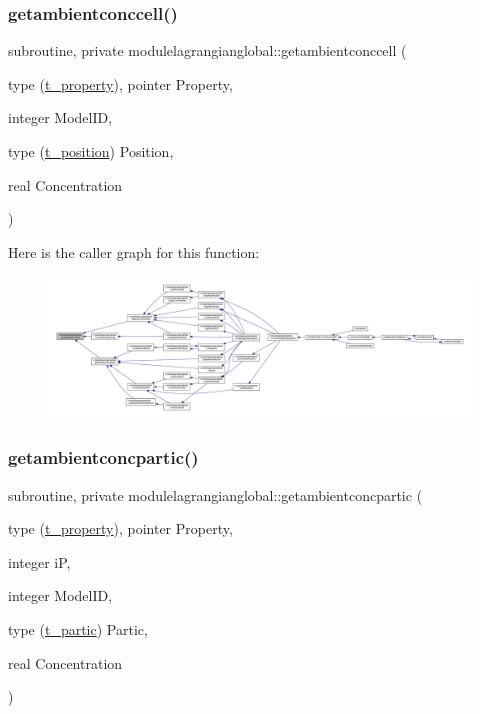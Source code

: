 \subsubsection{\texorpdfstring{getambientconccell()}{getambientconccell()}}
{\footnotesize\ttfamily subroutine, private modulelagrangianglobal\+::getambientconccell (\begin{DoxyParamCaption}\item[{type (\mbox{\hyperlink{structmodulelagrangianglobal_1_1t__property}{t\+\_\+property}}), pointer}]{Property,  }\item[{integer}]{Model\+ID,  }\item[{type (\mbox{\hyperlink{structmodulelagrangianglobal_1_1t__position}{t\+\_\+position}})}]{Position,  }\item[{real}]{Concentration }\end{DoxyParamCaption})\hspace{0.3cm}{\ttfamily [private]}}

Here is the caller graph for this function\+:\nopagebreak
\begin{figure}[H]
\begin{center}
\leavevmode
\includegraphics[width=350pt]{namespacemodulelagrangianglobal_a21c98c8cc24ebb92a5b8821af08be797_icgraph}
\end{center}
\end{figure}
\mbox{\label{namespacemodulelagrangianglobal_a48f3a78b845b645d04afad9baa94ac01}} 
\subsubsection{\texorpdfstring{getambientconcpartic()}{getambientconcpartic()}}
{\footnotesize\ttfamily subroutine, private modulelagrangianglobal\+::getambientconcpartic (\begin{DoxyParamCaption}\item[{type (\mbox{\hyperlink{structmodulelagrangianglobal_1_1t__property}{t\+\_\+property}}), pointer}]{Property,  }\item[{integer}]{iP,  }\item[{integer}]{Model\+ID,  }\item[{type (\mbox{\hyperlink{structmodulelagrangianglobal_1_1t__partic}{t\+\_\+partic}})}]{Partic,  }\item[{real}]{Concentration }\end{DoxyParamCaption})\hspace{0.3cm}{\ttfamily [private]}}

